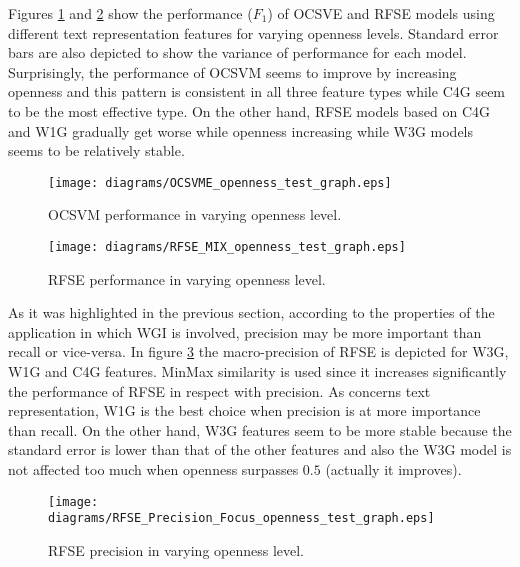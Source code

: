 \documentclass[runningheads]{llncs}
\begin{document}
Figures \ref{fig:OCSVME_openness_test} and \ref{fig:RFSE_openness_test} show the performance ($F_{1}$) of OCSVE and RFSE models using different text representation features for varying openness levels. Standard error bars are also depicted to show the variance of performance for each model. Surprisingly, the performance of OCSVM seems to improve by increasing openness and this pattern is consistent in all three feature types while C4G seem to be the most effective type. On the other hand, RFSE models based on C4G and W1G gradually get worse while openness increasing while W3G models seems to be relatively stable.

\begin{figure}[H]
\begin{center}
    \texttt{[image: diagrams/OCSVME\_openness\_test\_graph.eps]}
	\caption{OCSVM performance in varying openness level.}
	\label{fig:OCSVME_openness_test}
\end{center}
\end{figure}

\begin{figure}[H]
\begin{center}
    \texttt{[image: diagrams/RFSE\_MIX\_openness\_test\_graph.eps]}
	\caption{RFSE performance in varying openness level.}
	\label{fig:RFSE_openness_test}
\end{center}
\end{figure}
%
%

As it was highlighted in the previous section, according to the properties of the application in which WGI is involved, precision may be more important than recall or vice-versa. In figure \ref{fig:RFSE_precision_focus_openness_test} the macro-precision of RFSE is depicted for W3G, W1G and C4G features. MinMax similarity is used since it increases significantly the performance of RFSE in respect with precision. As concerns text representation, W1G is the best choice when precision is at more importance than recall. On the other hand, W3G features seem to be more stable because the standard error is lower than that of the other features and also the W3G model is not affected too much when openness surpasses $0.5$ (actually it improves).

\begin{figure}[H]
\begin{center}
    \texttt{[image: diagrams/RFSE\_Precision\_Focus\_openness\_test\_graph.eps]}
	\caption{RFSE precision in varying openness level.}
	\label{fig:RFSE_precision_focus_openness_test}
\end{center}
\end{figure}
\end{document}
